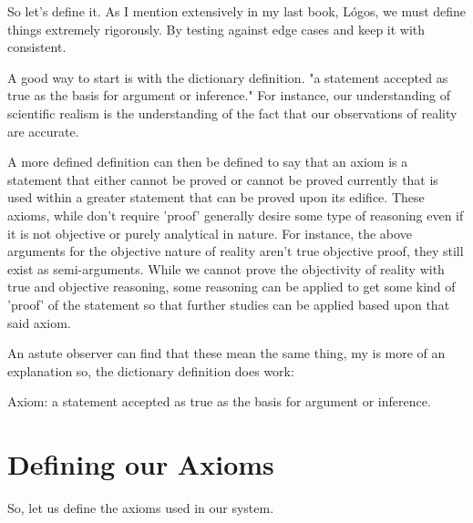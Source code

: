 So let's define it. As I mention extensively in my last book, Lógos, we must define things extremely rigorously. By testing against edge cases and keep it with consistent.

A good way to start is with the dictionary definition. "a statement accepted as true as the basis for argument or inference." For instance, our understanding of scientific realism is the understanding of the fact that our observations of reality are accurate.

A more defined definition can then be defined to say that an axiom is a statement that either cannot be proved or cannot be proved currently that is used within a greater statement that can be proved upon its edifice. These axioms, while don't require 'proof' generally desire some type of reasoning even if it is not objective or purely analytical in nature. For instance, the above arguments for the objective nature of reality aren't true objective proof, they still exist as semi-arguments. While we cannot prove the objectivity of reality with true and objective reasoning, some reasoning can be applied to get some kind of 'proof' of the statement so that further studies can be applied based upon that said axiom.

An astute observer can find that these mean the same thing, my is more of an explanation so, the dictionary definition does work:
\begin{definition}
    Axiom: a statement accepted as true as the basis for argument or inference.
\end{definition}
\section{Defining our Axioms}
So, let us define the axioms used in our system.
